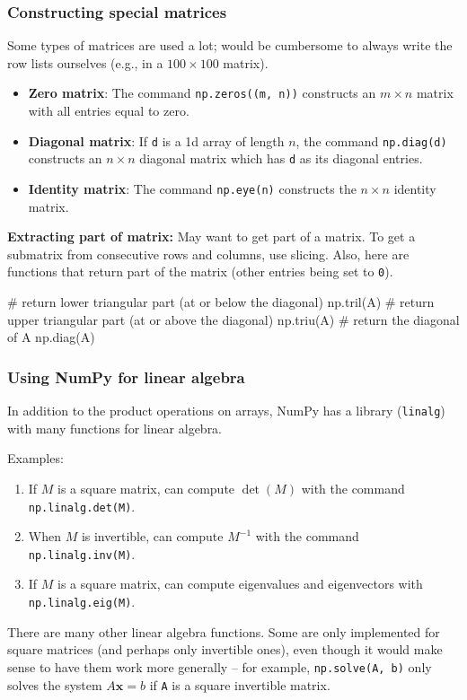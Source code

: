 \documentclass{beamer}
\newenvironment{codeblock}
    {\hfill\begin{beamerboxesrounded}[lower=codecol, width=0.8\textwidth]
    \medskip

    }
    { 
    \end{beamerboxesrounded}\hfill
    }
\theoremstyle{example}
\newcommand{\ttt}[1]{{\small\texttt{#1}}}
\begin{document}
\begin{frame}[fragile]
\frametitle{Constructing special matrices}
Some types of matrices are used a lot; would be cumbersome to always write the row lists ourselves (e.g., in a $100\times100$ matrix).
    
    \begin{itemize}
        \item[] \textbf{Zero matrix}: The command \ttt{np.zeros((m, n))} constructs an $m\times n$ matrix with all entries equal to zero.
        \pause
        \item[] \textbf{Diagonal matrix}: If \ttt{d} is a 1d array of length $n$, the command \ttt{np.diag(d)} constructs an $n\times n$ diagonal matrix which has \ttt{d} as its diagonal entries.
        \pause
        \item[] \textbf{Identity matrix}: The command \ttt{np.eye(n)} constructs the $n\times n$ identity matrix.
    \end{itemize}
    
\textbf{Extracting part of matrix:} May want to get part of a matrix. To get a submatrix from consecutive rows and columns, use slicing. \pause
Also, here are functions that return part of the matrix (other entries being set to \ttt{0}).%

\begin{codeblock}

\begin{python}
# return lower triangular part (at or below the diagonal)
np.tril(A)
# return upper triangular part (at or above the diagonal)
np.triu(A)
# return the diagonal of A
np.diag(A)
\end{python}

\end{codeblock}
\end{frame}

\begin{frame}
\frametitle{Using NumPy for linear algebra}
In addition to the product operations on arrays, NumPy has a library (\ttt{linalg}) with many functions for linear algebra. 

\pause
Examples: 
\begin{enumerate}
    \item If $M$ is a square matrix, can compute $\det(M)$ with the command \ttt{np.linalg.det(M)}.
    \pause
    \item When $M$ is invertible, can compute $M^{-1}$ with the command \ttt{np.linalg.inv(M)}.
    \pause
    \item If $M$ is a square matrix, can compute eigenvalues and eigenvectors with \ttt{np.linalg.eig(M)}. 
\end{enumerate}

\pause
There are many other linear algebra functions. Some are only implemented for square matrices (and perhaps only invertible ones), even though it would make sense to have them work more generally {--} for example, \ttt{np.solve(A, b)} only solves the system $A\mathbf{x} = b$ if \ttt{A} is a square invertible matrix.
\end{frame}
\end{document}

